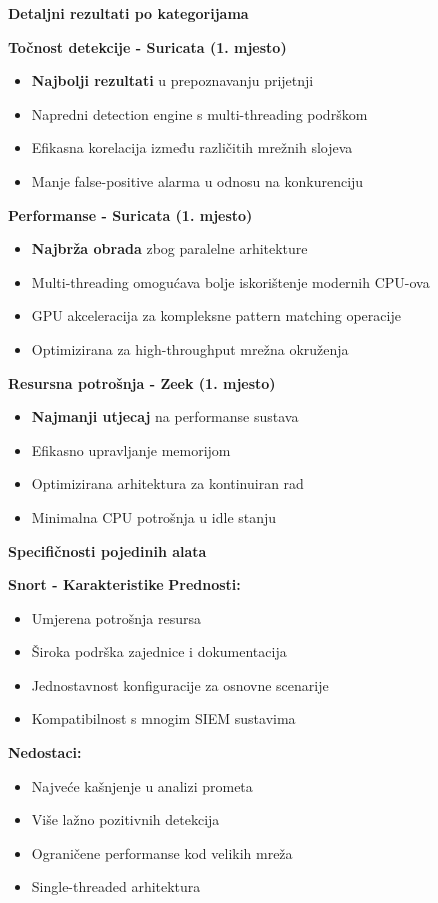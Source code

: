 \textbf{Detaljni rezultati po kategorijama}

\textbf{Točnost detekcije - Suricata (1. mjesto)}
\begin{itemize}
\item \textbf{Najbolji rezultati} u prepoznavanju prijetnji
\item Napredni detection engine s multi-threading podrškom
\item Efikasna korelacija između različitih mrežnih slojeva
\item Manje false-positive alarma u odnosu na konkurenciju
\end{itemize}

\textbf{Performanse - Suricata (1. mjesto)}
\begin{itemize}
\item \textbf{Najbrža obrada} zbog paralelne arhitekture
\item Multi-threading omogućava bolje iskorištenje modernih CPU-ova
\item GPU akceleracija za kompleksne pattern matching operacije
\item Optimizirana za high-throughput mrežna okruženja
\end{itemize}

\textbf{Resursna potrošnja - Zeek (1. mjesto)}
\begin{itemize}
\item \textbf{Najmanji utjecaj} na performanse sustava
\item Efikasno upravljanje memorijom
\item Optimizirana arhitektura za kontinuiran rad
\item Minimalna CPU potrošnja u idle stanju
\end{itemize}

\textbf{Specifičnosti pojedinih alata}

\textbf{Snort - Karakteristike}
\textbf{Prednosti:}
\begin{itemize}
\item Umjerena potrošnja resursa
\item Široka podrška zajednice i dokumentacija
\item Jednostavnost konfiguracije za osnovne scenarije
\item Kompatibilnost s mnogim SIEM sustavima
\end{itemize}

\textbf{Nedostaci:}
\begin{itemize}
\item Najveće kašnjenje u analizi prometa
\item Više lažno pozitivnih detekcija
\item Ograničene performanse kod velikih mreža
\item Single-threaded arhitektura
\end{itemize}

